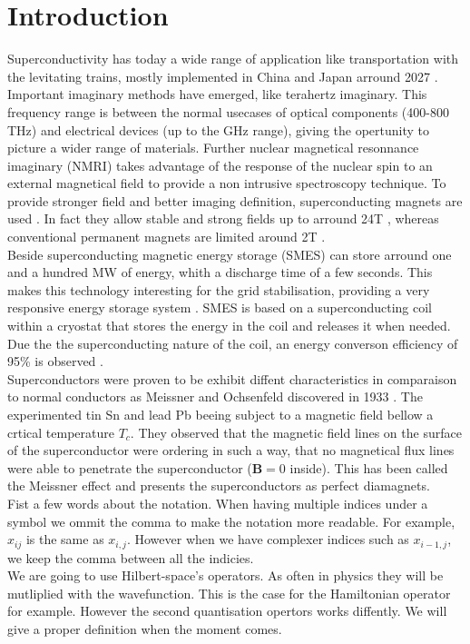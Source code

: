 \documentclass[../main.tex]{subfile}
\begin{document}
\section{Introduction}

Superconductivity has today a wide range of application like transportation with the levitating trains, mostly implemented in China \cite{Roque2024} and Japan arround 2027 \cite{Nishijima2013}.
Important imaginary methods have emerged, like terahertz imaginary. This frequency range is between the normal usecases of 
optical components (400-800 THz) and electrical devices (up to the GHz range), giving the opertunity to picture a wider range of materials.
Further nuclear magnetical resonnance imaginary (NMRI) takes advantage of the response of the nuclear spin to an external 
magnetical field to provide a non intrusive spectroscopy technique. To provide stronger field and better imaging definition, superconducting magnets are used \cite{Nakamura2015}. In fact they
allow stable and strong fields up to arround 24T \cite{Hashi2015}, whereas conventional permanent magnets are limited around 2T \cite{Haishi2005}.\\
Beside superconducting magnetic energy storage (SMES) can store arround one and a hundred MW of energy, whith a discharge time of a few seconds. This makes
this technology interesting for the grid stabilisation, providing a very responsive energy storage system \cite{Tixador2008}.
SMES is based on a superconducting coil within a cryostat that stores the energy in the coil and releases it when needed. Due the the superconducting nature of the coil,
 an energy converson efficiency of 95\% is observed \cite{Tixador2008}.\\



Superconductors were proven to be exhibit diffent characteristics in comparaison to normal conductors as
Meissner and Ochsenfeld discovered in 1933 \cite{MeissnerOchsenfeld1933}. 
The experimented tin Sn and lead Pb beeing subject to a magnetic field bellow a crtical temperature $T_c$. They observed that the magnetic field lines on the surface
of the superconductor were ordering in such a way, that no magnetical flux lines were able to penetrate the superconductor ($\bm{B} = 0$ inside). This has been called the Meissner effect
and presents the superconductors as perfect diamagnets.\\

Fist a few words about the notation. When having multiple indices under a symbol we ommit the comma to make the notation more readable. 
For example, $x_{ij}$ is the same as $x_{i,j}$. However when we have complexer indices such as $x_{i-1, j}$, we keep the comma between all
the indicies.\\

We are going to use Hilbert-space's operators. As often in physics they will be mutliplied with the wavefunction. This is the case for the Hamiltonian 
operator for example. However the second quantisation opertors works diffently. We will give a proper definition when the moment comes.
\end{document}
